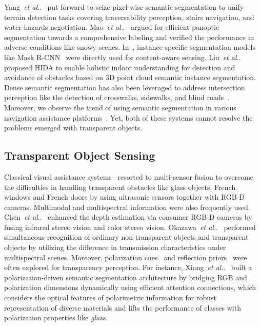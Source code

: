 \documentclass[journal]{IEEEtran}
\makeatletter
\DeclareRobustCommand\onedot{\futurelet\@let@token\@onedot}
\def\@onedot{\ifx\@let@token.\else.\null\fi\xspace}
\def\etal{\emph{et al}\onedot}
\makeatother
\begin{document}
Yang~\etal~\cite{yang2018unifying} put forward to seize pixel-wise semantic segmentation to unify terrain detection tasks covering traversability perception, stairs navigation, and water-hazards negotiation. Mao~\etal~\cite{mao2021panoptic} argued for efficient panoptic segmentation towards a comprehensive labeling and verified the performance in adverse conditions like snowy scenes. In~\cite{long2019unifying,yohannes2019content}, instance-specific segmentation models like Mask R-CNN~\cite{he2017mask} were directly used for content-aware sensing. Liu~\etal~\cite{liu2021hida} proposed HIDA to enable holistic indoor understanding for detection and avoidance of obstacles based on 3D point cloud semantic instance segmentation. Dense semantic segmentation has also been leveraged to address intersection perception like the detection of crosswalks, sidewalks, and blind roads~\cite{cao2020rapid,yang2018intersection,hsieh2020outdoor}.
Moreover, we observe the trend of using semantic segmentation in various navigation assistance platforms~\cite{duh2020v,lin2019deep,mahendran2021computer}. Yet, both of these systems cannot resolve the problems emerged with transparent objects.

\subsection{Transparent Object Sensing}
Classical visual assistance systems~\cite{bai2017smart,huang2018glass} resorted to multi-sensor fusion to overcome the difficulties in handling transparent obstacles like glass objects, French windows and French doors by using ultrasonic sensors together with RGB-D cameras.
Multimodal and multispectral information were also frequently used. Chen~\etal~\cite{chen2018improving} enhanced the depth estimation via consumer RGB-D cameras by fusing infrared stereo vision and color stereo vision.
Okazawa~\etal~\cite{okazawa2019simultaneous} performed simultaneous recognition of ordinary non-transparent objects and transparent objects by utilizing the difference in transmission characteristics under multispectral scenes. Moreover, polarization cues~\cite{deep_polarization_cues} and reflection priors~\cite{lin2021rich} were often explored for transparency perception. For instance, Xiang~\etal~\cite{xiang2021polarization} built a polarization-driven semantic segmentation architecture by bridging RGB and polarization dimensions dynamically using efficient attention connections, which considers the optical features of polarimetric information for robust representation of diverse materials and lifts the performance of classes with polarization properties like \emph{glass}.
\end{document}
